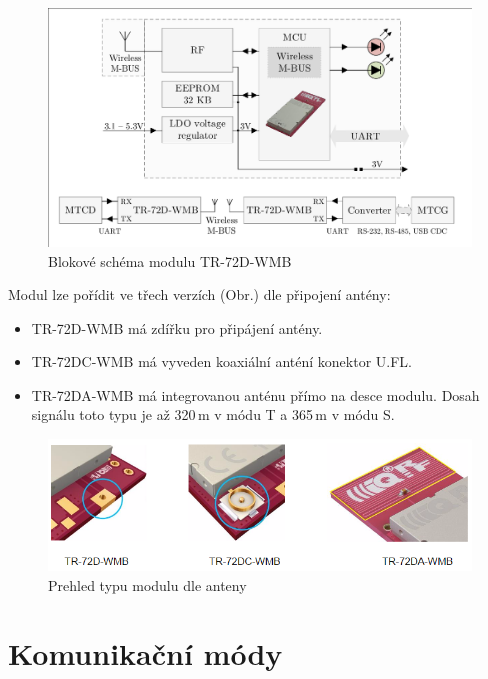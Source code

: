 \newpage

 \begin{figure}[!h]
  \begin{center}
    \includegraphics[scale=0.6]{obrazky/modul_block}
  \end{center}
  \caption{Blokové schéma modulu TR-72D-WMB \cite{iqrfmodul}}
	\label{BlokovkaIQRF}
\end{figure}

Modul lze pořídit ve třech verzích (Obr.\label{ObrazekAnteny}) dle připojení antény:
\begin{itemize}
		\item TR-72D-WMB má zdířku pro připájení antény.
		\item TR-72DC-WMB	má vyveden koaxiální anténí konektor U.FL. 
		\item TR-72DA-WMB má integrovanou anténu přímo na desce modulu. Dosah signálu toto typu je až 320\,m v módu T a 365\,m v módu S.
\end{itemize}
 \begin{figure}[!h]
  \begin{center}
    \includegraphics[scale=0.7]{obrazky/modul_antena}
  \end{center}
  \caption{Prehled typu modulu dle anteny \cite{iqrfmodul}}
	\label{ObrazekAnteny}
\end{figure}

\section{Komunikační módy}

